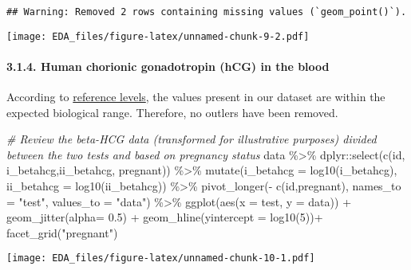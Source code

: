 \documentclass[
]{article}
\newenvironment{Shaded}{\begin{snugshade}}{\end{snugshade}}
\newcommand{\AttributeTok}[1]{\textcolor[rgb]{0.77,0.63,0.00}{#1}}
\newcommand{\CommentTok}[1]{\textcolor[rgb]{0.56,0.35,0.01}{\textit{#1}}}
\newcommand{\DecValTok}[1]{\textcolor[rgb]{0.00,0.00,0.81}{#1}}
\newcommand{\FloatTok}[1]{\textcolor[rgb]{0.00,0.00,0.81}{#1}}
\newcommand{\FunctionTok}[1]{\textcolor[rgb]{0.00,0.00,0.00}{#1}}
\newcommand{\NormalTok}[1]{#1}
\newcommand{\SpecialCharTok}[1]{\textcolor[rgb]{0.00,0.00,0.00}{#1}}
\newcommand{\StringTok}[1]{\textcolor[rgb]{0.31,0.60,0.02}{#1}}
\begin{document}
\begin{verbatim}
## Warning: Removed 2 rows containing missing values (`geom_point()`).
\end{verbatim}

\texttt{[image: EDA\_files/figure-latex/unnamed-chunk-9-2.pdf]}

\hypertarget{human-chorionic-gonadotropin-hcg-in-the-blood}{%
\paragraph{3.1.4. Human chorionic gonadotropin (hCG) in the
blood}\label{human-chorionic-gonadotropin-hcg-in-the-blood}}

According to
\href{https://americanpregnancy.org/getting-pregnant/hcg-levels/}{reference
levels}, the values present in our dataset are within the expected
biological range. Therefore, no outlers have been removed.

\begin{Shaded}
\begin{Highlighting}[]
\CommentTok{\# Review the beta{-}HCG data (transformed for illustrative purposes) divided between the two tests and based on pregnancy status}
\NormalTok{data }\SpecialCharTok{\%\textgreater{}\%} 
\NormalTok{  dplyr}\SpecialCharTok{::}\FunctionTok{select}\NormalTok{(}\FunctionTok{c}\NormalTok{(id, i\_betahcg,ii\_betahcg, pregnant)) }\SpecialCharTok{\%\textgreater{}\%} 
  \FunctionTok{mutate}\NormalTok{(}\AttributeTok{i\_betahcg =} \FunctionTok{log10}\NormalTok{(i\_betahcg),}
         \AttributeTok{ii\_betahcg =} \FunctionTok{log10}\NormalTok{(ii\_betahcg)) }\SpecialCharTok{\%\textgreater{}\%}
  \FunctionTok{pivot\_longer}\NormalTok{(}\SpecialCharTok{{-}} \FunctionTok{c}\NormalTok{(id,pregnant), }\AttributeTok{names\_to =} \StringTok{"test"}\NormalTok{, }\AttributeTok{values\_to =} \StringTok{"data"}\NormalTok{) }\SpecialCharTok{\%\textgreater{}\%} 
  \FunctionTok{ggplot}\NormalTok{(}\FunctionTok{aes}\NormalTok{(}\AttributeTok{x =}\NormalTok{ test, }\AttributeTok{y =}\NormalTok{ data)) }\SpecialCharTok{+}
  \FunctionTok{geom\_jitter}\NormalTok{(}\AttributeTok{alpha=} \FloatTok{0.5}\NormalTok{) }\SpecialCharTok{+}
  \FunctionTok{geom\_hline}\NormalTok{(}\AttributeTok{yintercept =} \FunctionTok{log10}\NormalTok{(}\DecValTok{5}\NormalTok{))}\SpecialCharTok{+} 
  \FunctionTok{facet\_grid}\NormalTok{(}\StringTok{"pregnant"}\NormalTok{)}
\end{Highlighting}
\end{Shaded}

\texttt{[image: EDA\_files/figure-latex/unnamed-chunk-10-1.pdf]}
\end{document}
